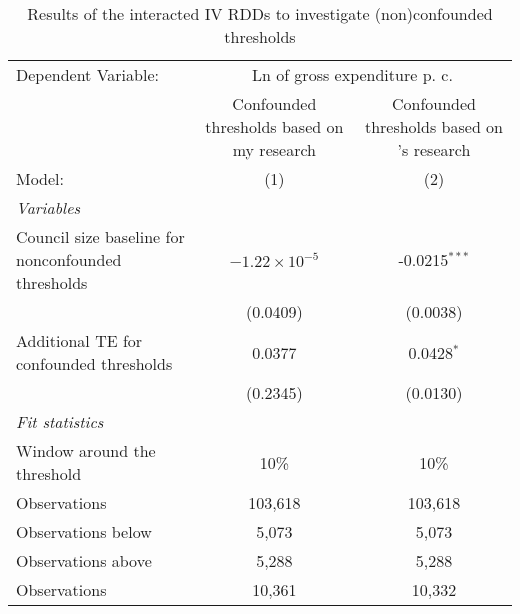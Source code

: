 
\begin{table}[htbp]
   \caption{\label{tab:rdd_conf_thresholds} Results of the interacted \acs{IV} \acs{RDD}s to investigate (non)confounded thresholds}
   \centering
   \begin{tabular}{lcc}
      \tabularnewline \midrule \midrule
      Dependent Variable: & \multicolumn{2}{c}{Ln of gross expenditure p. c.}\\
                                                                              & Confounded thresholds based on my research & Confounded thresholds based on \citeauthor{Hohmann.2017}'s \parencite*{Hohmann.2017} research \\     
      Model:                                                                  & (1)                                        & (2)\\  
      \midrule
      \emph{Variables}\\
      Council size baseline for nonconfounded thresholds                      & $-1.22\times 10^{-5}$                      & -0.0215$^{***}$\\   
                                                                              & (0.0409)                                   & (0.0038)\\   
      Additional TE for confounded thresholds                                 & 0.0377                                     & 0.0428$^{*}$\\   
                                                                              & (0.2345)                                   & (0.0130)\\   
      \midrule
      \emph{Fit statistics}\\
      Window around the threshold                                             & 10\%                                       & 10\%\\   
      Observations                                                            & 103,618                                    & 103,618\\  
      Observations below                                                      & 5,073                                      & 5,073\\  
      Observations above                                                      & 5,288                                      & 5,288\\  
      Observations                                                            & 10,361                                     & 10,332\\  

\end{tabular}
\end{table}
